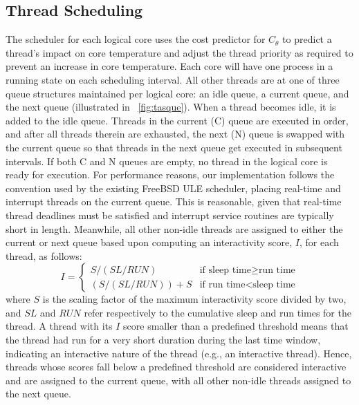 \documentclass[times, 10pt,twocolumn]{IEEEtran}
\begin{document}
\subsection{Thread Scheduling}
\label{sec:selection} 
The scheduler for each logical core uses the cost predictor for
$C_{\theta}$ to predict a thread's impact on core temperature and adjust
the thread priority as required to prevent an increase in core
temperature. Each core will have one process in a running state on each
scheduling interval. All other threads are at one of three queue
structures maintained per logical core: an idle queue, a current queue,
and the next queue (illustrated in \figurename~\ref{fig:tasque}).  When
a thread becomes idle, it is added to the idle queue.  Threads in the
current (C) queue are executed in order, and after all threads therein
are exhausted, the next (N) queue is swapped with the current queue so
that threads in the next queue get executed in subsequent intervals.  If
both C and N queues are empty, no thread in the logical core is ready
for execution.  For performance reasons, our implementation follows the
convention used by the existing FreeBSD ULE scheduler, placing real-time
and interrupt threads on the current queue.  This is reasonable, given
that real-time thread deadlines must be satisfied and interrupt service
routines are typically short in length.  Meanwhile, all other non-idle
threads are assigned to either the current or next queue based upon
computing an interactivity score, $I$, for each thread, as follows:
\begin{equation}
\label{eq:interactsleeprun} 
I =   
\begin{cases}
  S / (SL/RUN) & \text{if sleep time} \geq \text{run time}\\
  (S/ (SL / RUN))+S & \text{if run time} < \text{sleep time}
\end{cases}
\end{equation}
where $S$ is the scaling factor of the
maximum interactivity score divided by two, and $SL$ and $RUN$ refer
respectively to the cumulative sleep and run times for the thread.
A thread with its $I$ score smaller than a predefined threshold means that
the thread had run for a very short duration during the last time window,
indicating an interactive nature of the thread (e.g., an interactive thread).   
Hence, threads whose scores fall below a predefined threshold are considered
interactive and are assigned to the current queue, with all other non-idle
threads assigned to the next queue.
\end{document}
